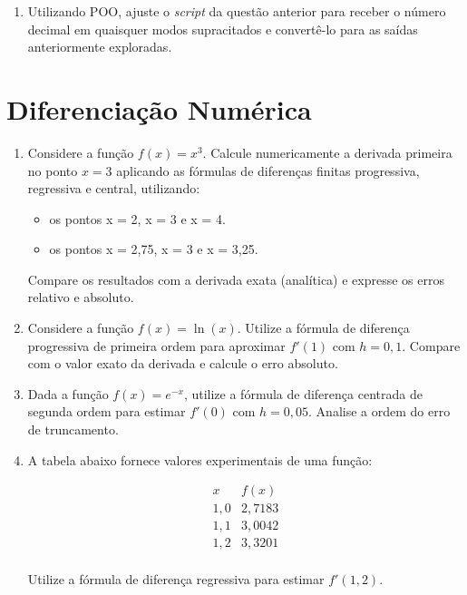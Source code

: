 \begin{enumerate}[label=\thesection.\arabic*]
\item Utilizando POO, ajuste o {\it script} da questão anterior para receber o número decimal em quaisquer modos supracitados e convertê-lo para as saídas 
    anteriormente exploradas.

\end{enumerate}
\clearpage
\section{Diferenciação Numérica} \label{sec:diferenciação}

\begin{enumerate}[label=\thesection.\arabic*]
\item  Considere a função $f(x) = x^3$. Calcule numericamente a derivada primeira no ponto $x = 3$
 aplicando as fórmulas de diferenças finitas progressiva, regressiva e central, utilizando:
\begin{itemize}
    \item os pontos x = 2, x = 3 e x = 4.
    \item os pontos x = 2,75, x = 3 e x = 3,25.
\end{itemize} 
Compare os resultados com a derivada exata (analítica) e expresse os erros relativo e absoluto.


\item Considere a função $f(x) = \ln(x)$. 
Utilize a fórmula de diferença progressiva de primeira ordem para aproximar $f'(1)$ com $h = 0{,}1$. 
Compare com o valor exato da derivada e calcule o erro absoluto.

\item Dada a função $f(x) = e^{-x}$, utilize a fórmula de diferença centrada de segunda ordem para estimar $f'(0)$ com $h = 0{,}05$. 
Analise a ordem do erro de truncamento.

\item A tabela abaixo fornece valores experimentais de uma função:

\[
\begin{array}{c|c}
x & f(x) \\
\hline
1{,}0 & 2{,}7183 \\
1{,}1 & 3{,}0042 \\
1{,}2 & 3{,}3201 \\
\end{array}
\]

Utilize a fórmula de diferença regressiva para estimar $f'(1{,}2)$.


\end{enumerate}
